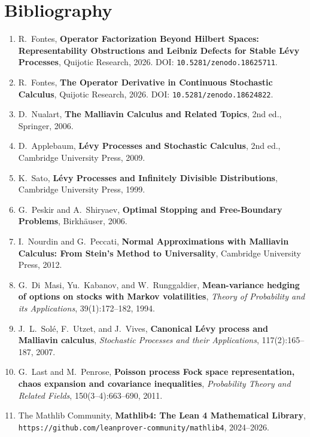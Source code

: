 \chapter*{Bibliography}

\begin{enumerate}

\item\label{bib:fontes2026}
R.~Fontes,
\textbf{Operator Factorization Beyond Hilbert Spaces: Representability Obstructions and Leibniz Defects for Stable L\'evy Processes},
Quijotic Research, 2026.
DOI: \texttt{10.5281/zenodo.18625711}.

\item\label{bib:fontes2026hilbert}
R.~Fontes,
\textbf{The Operator Derivative in Continuous Stochastic Calculus},
Quijotic Research, 2026.
DOI: \texttt{10.5281/zenodo.18624822}.

\item\label{bib:nualart2006}
D.~Nualart,
\textbf{The Malliavin Calculus and Related Topics},
2nd ed., Springer, 2006.

\item\label{bib:applebaum2009}
D.~Applebaum,
\textbf{L\'evy Processes and Stochastic Calculus},
2nd ed., Cambridge University Press, 2009.

\item\label{bib:sato1999}
K.~Sato,
\textbf{L\'evy Processes and Infinitely Divisible Distributions},
Cambridge University Press, 1999.

\item\label{bib:peskir2006}
G.~Peskir and A.~Shiryaev,
\textbf{Optimal Stopping and Free-Boundary Problems},
Birkh\"auser, 2006.

\item\label{bib:nourdin2012}
I.~Nourdin and G.~Peccati,
\textbf{Normal Approximations with Malliavin Calculus: From Stein's Method to Universality},
Cambridge University Press, 2012.

\item\label{bib:dimasi1994}
G.~Di~Masi, Yu.~Kabanov, and W.~Runggaldier,
\textbf{Mean-variance hedging of options on stocks with Markov volatilities},
\textit{Theory of Probability and its Applications}, 39(1):172--182, 1994.

\item\label{bib:sole2007}
J.~L.~Sol\'e, F.~Utzet, and J.~Vives,
\textbf{Canonical L\'evy process and Malliavin calculus},
\textit{Stochastic Processes and their Applications}, 117(2):165--187, 2007.

\item\label{bib:last2011}
G.~Last and M.~Penrose,
\textbf{Poisson process Fock space representation, chaos expansion and covariance inequalities},
\textit{Probability Theory and Related Fields}, 150(3--4):663--690, 2011.

\item\label{bib:mathlib}
The Mathlib Community,
\textbf{Mathlib4: The Lean 4 Mathematical Library},
\texttt{https://github.com/leanprover-community/mathlib4}, 2024--2026.

\end{enumerate}
